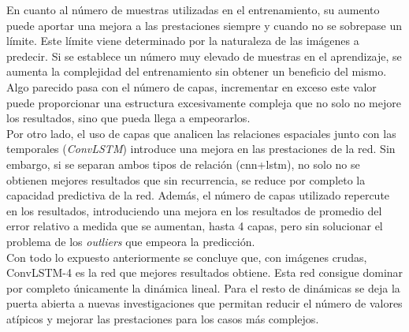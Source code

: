 En cuanto al número de muestras utilizadas en el entrenamiento, su aumento puede aportar una mejora a las prestaciones siempre y cuando no se sobrepase un límite. Este límite viene determinado por la naturaleza de las imágenes a predecir. Si se establece un número muy elevado de muestras en el aprendizaje, se aumenta la complejidad del entrenamiento sin obtener un beneficio del mismo. Algo parecido pasa con el número de capas, incrementar en exceso este valor puede proporcionar una estructura excesivamente compleja que no solo no mejore los resultados, sino que pueda llega a empeorarlos.\\

Por otro lado, el uso de capas que analicen las relaciones espaciales junto con las temporales (\textit{ConvLSTM}) introduce una mejora en las prestaciones de la red. Sin embargo, si se separan ambos tipos de relación (\acrshort{cnn}+\acrshort{lstm}), no solo no se obtienen mejores resultados que sin recurrencia, se reduce por completo la capacidad predictiva de la red. Además, el número de capas utilizado repercute en los resultados, introduciendo una mejora en los resultados de promedio del error relativo a medida que se aumentan, hasta 4 capas, pero sin solucionar el problema de los \textit{outliers} que empeora la predicción.\\

Con todo lo expuesto anteriormente se concluye que, con imágenes crudas, ConvLSTM-4 es  la red que mejores resultados obtiene. Esta red consigue dominar por completo únicamente la dinámica lineal. Para el resto de dinámicas se deja la puerta abierta a nuevas investigaciones que permitan reducir el número de valores atípicos y mejorar las prestaciones para los casos más complejos.